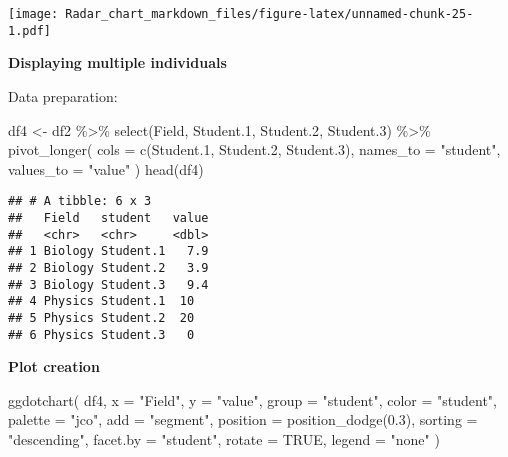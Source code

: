 \documentclass[
]{article}
\newenvironment{Shaded}{\begin{snugshade}}{\end{snugshade}}
\newcommand{\AttributeTok}[1]{\textcolor[rgb]{0.77,0.63,0.00}{#1}}
\newcommand{\ConstantTok}[1]{\textcolor[rgb]{0.00,0.00,0.00}{#1}}
\newcommand{\FloatTok}[1]{\textcolor[rgb]{0.00,0.00,0.81}{#1}}
\newcommand{\FunctionTok}[1]{\textcolor[rgb]{0.00,0.00,0.00}{#1}}
\newcommand{\NormalTok}[1]{#1}
\newcommand{\OtherTok}[1]{\textcolor[rgb]{0.56,0.35,0.01}{#1}}
\newcommand{\SpecialCharTok}[1]{\textcolor[rgb]{0.00,0.00,0.00}{#1}}
\newcommand{\StringTok}[1]{\textcolor[rgb]{0.31,0.60,0.02}{#1}}
\begin{document}
\texttt{[image: Radar\_chart\_markdown\_files/figure-latex/unnamed-chunk-25-1.pdf]}

\textbf{Displaying multiple individuals}

Data preparation:

\begin{Shaded}
\begin{Highlighting}[]
\NormalTok{df4 }\OtherTok{\textless{}{-}}\NormalTok{ df2 }\SpecialCharTok{\%\textgreater{}\%}
  \FunctionTok{select}\NormalTok{(Field, Student}\FloatTok{.1}\NormalTok{, Student}\FloatTok{.2}\NormalTok{, Student}\FloatTok{.3}\NormalTok{) }\SpecialCharTok{\%\textgreater{}\%}
  \FunctionTok{pivot\_longer}\NormalTok{(}
    \AttributeTok{cols =} \FunctionTok{c}\NormalTok{(Student}\FloatTok{.1}\NormalTok{, Student}\FloatTok{.2}\NormalTok{, Student}\FloatTok{.3}\NormalTok{),}
    \AttributeTok{names\_to =} \StringTok{"student"}\NormalTok{,}
    \AttributeTok{values\_to =} \StringTok{"value"}
\NormalTok{  )}
\FunctionTok{head}\NormalTok{(df4)}
\end{Highlighting}
\end{Shaded}

\begin{verbatim}
## # A tibble: 6 x 3
##   Field   student   value
##   <chr>   <chr>     <dbl>
## 1 Biology Student.1   7.9
## 2 Biology Student.2   3.9
## 3 Biology Student.3   9.4
## 4 Physics Student.1  10  
## 5 Physics Student.2  20  
## 6 Physics Student.3   0
\end{verbatim}

\textbf{Plot creation}

\begin{Shaded}
\begin{Highlighting}[]
\FunctionTok{ggdotchart}\NormalTok{(}
\NormalTok{  df4, }\AttributeTok{x =} \StringTok{"Field"}\NormalTok{, }\AttributeTok{y =} \StringTok{"value"}\NormalTok{, }
  \AttributeTok{group =} \StringTok{"student"}\NormalTok{, }\AttributeTok{color =} \StringTok{"student"}\NormalTok{, }\AttributeTok{palette =} \StringTok{"jco"}\NormalTok{,}
  \AttributeTok{add =} \StringTok{"segment"}\NormalTok{, }\AttributeTok{position =} \FunctionTok{position\_dodge}\NormalTok{(}\FloatTok{0.3}\NormalTok{),}
  \AttributeTok{sorting =} \StringTok{"descending"}\NormalTok{, }\AttributeTok{facet.by =} \StringTok{"student"}\NormalTok{,}
  \AttributeTok{rotate =} \ConstantTok{TRUE}\NormalTok{, }\AttributeTok{legend =} \StringTok{"none"}
\NormalTok{  )}
\end{Highlighting}
\end{Shaded}
\end{document}
